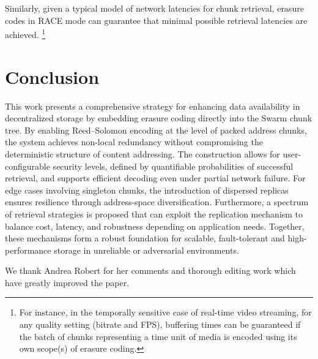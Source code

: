\documentclass[manuscript,screen,review]{acmart}
\begin{document}
Similarly, given a typical model of network latencies for chunk retrieval, erasure codes in \textsc{RACE} mode can guarantee that minimal possible retrieval latencies are achieved.%
%
\footnote{For instance, in the temporally sensitive case of real-time video streaming, for any quality setting (bitrate and FPS), buffering times can be guaranteed if the batch of chunks representing a time unit of media is encoded using its own scope(s) of erasure coding.}


\section{Conclusion}\label{sec:conclusion}

This work presents a comprehensive strategy for enhancing data availability in decentralized storage by embedding erasure coding directly into the Swarm chunk tree. By enabling Reed–Solomon encoding at the level of packed address chunks, the system achieves non-local redundancy without compromising the deterministic structure of content addressing. The construction allows for user-configurable security levels, defined by quantifiable probabilities of successful retrieval, and supports efficient decoding even under partial network failure. For edge cases involving singleton chunks, the introduction of dispersed replicas ensures resilience through address-space diversification. Furthermore, a spectrum of retrieval strategies is proposed that can exploit the replication mechanism to balance cost, latency, and robustness depending on application needs. Together, these mechanisms form a robust foundation for scalable, fault-tolerant and high-performance storage in unreliable or adversarial environments.

\begin{acks}
We thank Andrea Robert for her comments and thorough editing work which have greatly improved the paper.
\end{acks}





\end{document}

